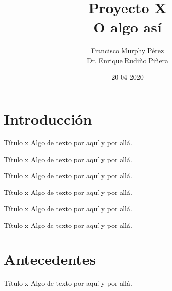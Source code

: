 \documentclass{beamer}
\title{Proyecto X \\ O algo así}
\author{Francisco Murphy Pérez \\ Dr. Enrique Rudiño Piñera}
\institute{Instituto de Biotecnología \\ Universidad Nacional Autónoma de México}
\date{20 04 2020}
\begin{document}

\begin{frame}
	\maketitle %
\end{frame}


\section{Introducción}

\begin{frame}{Título x}
	Algo de texto por aquí y por allá.
\end{frame}

\begin{frame}{Título x}
	Algo de texto por aquí y por allá.
\end{frame}

\begin{frame}{Título x}
	Algo de texto por aquí y por allá.
\end{frame}

\begin{frame}{Título x}
	Algo de texto por aquí y por allá.
\end{frame}

\begin{frame}{Título x}
	Algo de texto por aquí y por allá.
\end{frame}

\begin{frame}{Título x}
	Algo de texto por aquí y por allá.
\end{frame}


\section{Antecedentes}

\begin{frame}{Título x}
	Algo de texto por aquí y por allá.
\end{frame}
\end{document}
